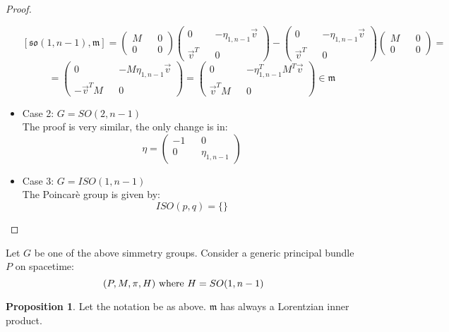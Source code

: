 \documentclass[12pt,a4paper]{report}
\theoremstyle{definition}
\theoremstyle{Theorem}
\newtheorem{Prop}[Def]{Proposition}
\theoremstyle{definition}
\theoremstyle{definition}
\begin{document}
\begin{proof}
\begin{itemize}
			$$[\mathfrak{so}(1,n-1),\mathfrak{m}]=\begin{pmatrix}
				M && 0 \\
				0 && 0
			\end{pmatrix}\begin{pmatrix}
				0 && -\eta_{1,n-1}\vec{v} \\
				\vec{v}^T && 0
			\end{pmatrix}-\begin{pmatrix}
			0 && -\eta_{1,n-1}\vec{v} \\
			\vec{v}^T && 0
			\end{pmatrix}\begin{pmatrix}
			M && 0 \\
			0 && 0
			\end{pmatrix}=$$
			$$=\begin{pmatrix}
				0 && -M\eta_{1,n-1}\vec{v} \\
				-\vec{v}^TM && 0
			\end{pmatrix}=\begin{pmatrix}
			0 && -\eta_{1,n-1}^TM^T\vec{v} \\
			\vec{v}^TM && 0
			\end{pmatrix}\in\mathfrak{m}$$
			\item Case 2: $G=SO(2,n-1)$\\
			The proof is very similar, the only change is in:
			$$\eta=\begin{pmatrix}
				-1 && 0\\
				0 && \eta_{1,n-1}
			\end{pmatrix}$$
			\item Case 3: $G=ISO(1,n-1)$
			\\
			The Poincarè group is given by:
			$$ISO(p,q)=\{\}$$
		\end{itemize}
	\end{proof}
	Let $G$ be one of the above simmetry groups. Consider a generic principal bundle $P$ on spacetime:
	$$(P,M,\pi,H)\hbox{ where }H=SO(1,n-1)$$
	\begin{Prop}Let the notation be as above.
		$\mathfrak{m}$ has always a Lorentzian inner product.
	\end{Prop}
\end{document}
